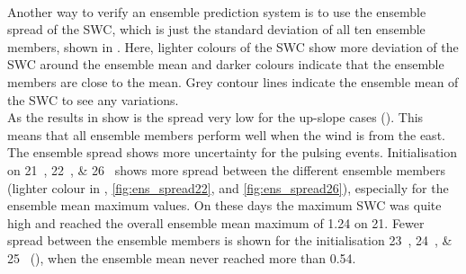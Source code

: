 %
\\[12pt]
Another way to verify an ensemble prediction system is to use the ensemble spread of the SWC, which is just the standard deviation of all ten ensemble members, shown in . Here, lighter colours of the SWC show more deviation of the SWC around the ensemble mean and darker colours indicate that the ensemble members are close to the mean. Grey contour lines indicate the ensemble mean of the SWC to see any variations.
\\
As the results in  show is the spread very low for the up-slope cases (). This means that all ensemble members perform well when the wind is from the east. 
\\
The ensemble spread shows more uncertainty for the pulsing events. 
Initialisation on \SIlist{21;22;26}{\UTC} shows more spread between the different ensemble members (lighter colour in , \ref{fig:ens_spread22}, and \ref{fig:ens_spread26}), especially for the ensemble mean maximum values. On these days the maximum SWC was quite high and reached the overall ensemble mean maximum of \SI{1.24}{\SWC} on \SI{21}{\dec}.
Fewer spread between the ensemble members is shown for the initialisation \SIlist{23;24;25}{\UTC} (), when the ensemble mean never reached more than \SI{0.54}{\SWC}.